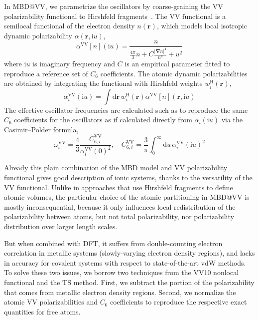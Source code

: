 In MBD@VV, we parametrize the oscillators by coarse-graining the VV polarizability functional to Hirshfeld fragments~\citep{HirshfeldTCA77,SatoJCP09,SatoJCP10}.
The VV functional is a semilocal functional of the electron density $n(\mathbf r)$, which models local isotropic dynamic polarizability $\alpha(\mathbf r,\mathrm iu)$,
\begin{equation}
   \alpha^\text{VV}[n](\mathrm iu)=\frac{n}{\frac{4\pi}3n+C\frac{|\boldsymbol\nabla n|^4}{n^4}+u^2}
   \label{eq:vv-functional}
\end{equation}
where $\mathrm iu$ is imaginary frequency and $C$ is an empirical parameter fitted to reproduce a reference set of $C_6$ coefficients.
The atomic dynamic polarizabilities are obtained by integrating the functional with Hirshfeld weights $w_i^\text{H}(\mathbf r)$,
\begin{equation}
  \alpha_i^\text{VV}(\mathrm iu)=\int\mathrm d\mathbf r\,w_i^\text{H}(\mathbf r)\alpha^\text{VV}[n](\mathbf r,\mathrm iu)
\end{equation}
The effective oscillator frequencies are calculated such as to reproduce the same $C_6$ coefficients for the oscillators as if calculated directly from $\alpha_i(\mathrm iu)$ via the Casimir--Polder formula,
\begin{equation}
  \omega_i^\text{VV}=\frac43\frac{C_{6,i}^\text{VV}}{\alpha_i^\text{VV}{(0)}^2},\quad
  C_{6,i}^\text{VV}=\frac3\pi\int_0^\infty\mathrm du\,\alpha_i^\text{VV}{(\mathrm iu)}^2
\end{equation}

Already this plain combination of the MBD model and VV polarizability functional gives good description of ionic systems, thanks to the versatility of the VV functional.
Unlike in approaches that use Hirshfeld fragments to define atomic volumes, the particular choice of the atomic partitioning in MBD@VV is mostly inconsequential, because it only influences local redistribution of the polarizability between atoms, but not total polarizability, nor polarizability distribution over larger length scales.



But when combined with DFT, it suffers from double-counting electron correlation in metallic systems (slowly-varying electron density regions), and lacks in accuracy for covalent systems with respect to state-of-the-art vdW methods.
To solve these two issues, we borrow two techniques from the VV10 nonlocal functional and the TS method.
First, we subtract the portion of the polarizability that comes from metallic electron density regions.
Second, we normalize the atomic VV polarizabilities and $C_6$ coefficients to reproduce the respective exact quantities for free atoms.

